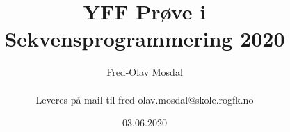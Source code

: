 \title {YFF Prøve i Sekvensprogrammering 2020}
\author {Fred-Olav Mosdal \\\\ Leveres på mail til fred-olav.mosdal@skole.rogfk.no }
\date {03.06.2020}
\maketitle
